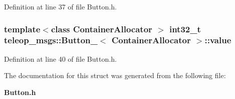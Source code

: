 Definition at line 37 of file Button.h.

\subsubsection[{value}]{\setlength{\rightskip}{0pt plus 5cm}template$<$class ContainerAllocator $>$ int32\_\-t {\bf teleop\_\-msgs::Button\_\-}$<$ ContainerAllocator $>$::{\bf value}}\label{structteleop__msgs_1_1Button___a41c16ae821d72bb241d7c16dc8a98fe8}


Definition at line 40 of file Button.h.



The documentation for this struct was generated from the following file:\begin{DoxyCompactItemize}
\item 
{\bf Button.h}\end{DoxyCompactItemize}
